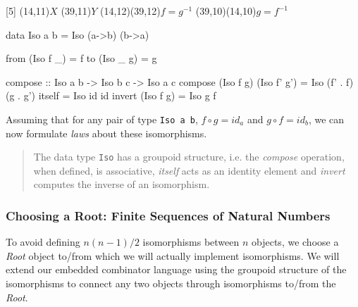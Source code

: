\begindc{\commdiag}[5]
\obj(14,11){$X$}
\obj(39,11){$Y$}
\mor(14,12)(39,12){$f=g^{-1}$}
\mor(39,10)(14,10){$g=f^{-1}$}
\enddc

\begin{code}
data Iso a b = Iso (a->b) (b->a)

from (Iso f _) = f
to (Iso _ g) = g

compose :: Iso a b -> Iso b c -> Iso a c
compose (Iso f g) (Iso f' g') = Iso (f' . f) (g . g')
itself = Iso id id
invert (Iso f g) = Iso g f
\end{code}
Assuming that for any pair of type {\tt Iso a b},  $f \circ g = id_a$ and $g
\circ f=id_b$, we can now formulate {\em laws} about these isomorphisms.
\begin{quote} 
The data type {\tt Iso} has a groupoid structure, i.e. the {\em compose}
operation, when defined, is associative, {\em itself} acts as an identity element
and {\em invert} computes the inverse of an isomorphism.
\end{quote}

\subsubsection*{Choosing a Root: Finite Sequences of Natural Numbers}
To avoid defining $n(n-1)/2$ isomorphisms between $n$ objects,
we choose a {\em Root} object to/from which we will actually
implement isomorphisms. We will extend our embedded
combinator language using the groupoid structure of the isomorphisms
to connect any two objects through isomorphisms to/from
the {\em Root}.
\begin{comment}
\begindc{\commdiag}[20]
\obj(10,10)[X]{$Root$}
\obj(14,10)[Aa]{$A$}

\obj(13,12)[Ac]{$B$}
\obj(12,13)[Ad]{$C$}

\obj(10,14)[Af]{$D$}

\obj(8,13)[Ah]{$E$}
\obj(7,12)[Ai]{$F$}

\obj(6,10)[Ak]{$G$}

\obj(7,8)[Am]{$H$}
\obj(8,7)[An]{$I$}

\obj(10,6)[Ap]{$J$}

\obj(12,7)[Ar]{$K$}
\obj(13,8)[As]{$L$}

\mor{X}{Aa}{$a$}

\mor{X}{Ac}{$b$}
\mor{X}{Ad}{$c$}

\mor{X}{Af}{$d$}

\mor{X}{Ah}{$e$}
\mor{X}{Ai}{$f$}

\mor{X}{Ak}{$g$}

\mor{X}{Am}{$h$}
\mor{X}{An}{$i$}

\mor{X}{Ap}{$j$}

\mor{X}{Ar}{$k$}
\mor{X}{As}{$l$}
\enddc
\end{comment}

